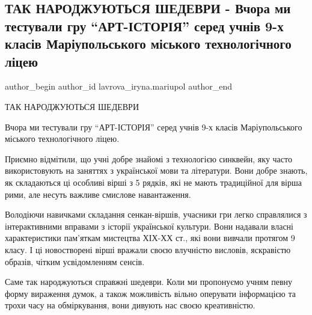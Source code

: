  
 
 
 
 

\subsection{ТАК НАРОДЖУЮТЬСЯ ШЕДЕВРИ - Вчора ми тестували гру \enquote{АРТ-ІСТОРІЯ} серед учнів 9-х класів Маріупольського міського технологічного ліцею}
\label{sec:25_05_2021.fb.lavrova_iryna.mariupol.1.tak_narodzhuyutsya_s}

\ifcmt
 author_begin
   author_id lavrova_iryna.mariupol
 author_end
\fi

ТАК НАРОДЖУЮТЬСЯ ШЕДЕВРИ

Вчора ми тестували гру \enquote{АРТ-ІСТОРІЯ} серед учнів 9-х класів Маріупольського
міського технологічного ліцею. 

Приємно відмітили, що учні добре знайомі з технологією синквейн, яку часто
використовують на заняттях з української мови та літератури. Вони добре знають,
як складаються ці особливі вірші з 5 рядків, які не мають традиційної для вірша
рими, але несуть важливе смислове навантаження.

Володіючи навичками складання сенкан-віршів, учасники гри легко справлялися з
інтерактивними вправами з історії української культури. Вони надавали власні
характеристики пам'яткам мистецтва ХІХ-ХХ ст., які вони вивчали протягом 9
класу. І ці новостворені вірші вражали своєю влучністю висловів, яскравістю
образів, чітким усвідомленням сенсів. 

Саме так народжуються справжні шедеври. Коли ми пропонуємо учням певну форму
вираження думок, а також можливість вільно оперувати інформацією та трохи часу
на обміркування, вони дивують нас своєю креативністю.  

